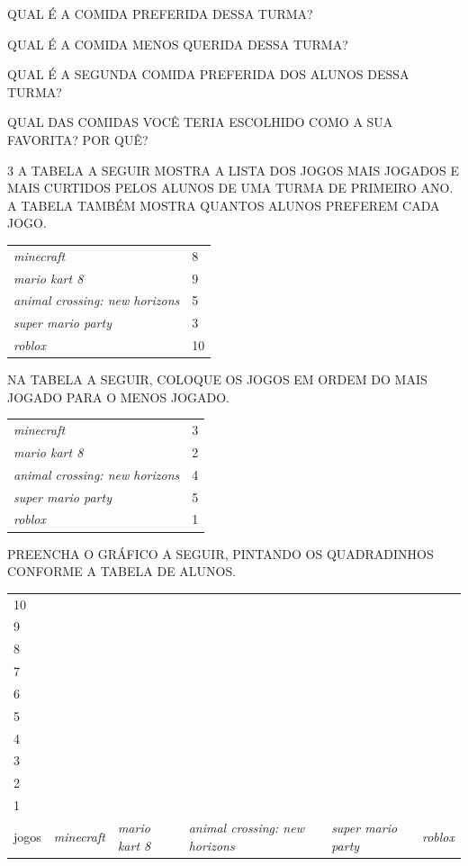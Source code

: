 \begin{escolha}
\item QUAL É A COMIDA PREFERIDA DESSA TURMA?


\item QUAL É A COMIDA MENOS QUERIDA DESSA TURMA?


\item QUAL É A SEGUNDA COMIDA PREFERIDA DOS ALUNOS DESSA TURMA?


\item QUAL DAS COMIDAS VOCÊ TERIA ESCOLHIDO COMO A SUA FAVORITA? POR QUÊ?

\end{escolha}

\num{3} A TABELA A SEGUIR MOSTRA A LISTA DOS JOGOS MAIS JOGADOS E MAIS CURTIDOS PELOS
ALUNOS DE UMA TURMA DE PRIMEIRO ANO. A TABELA TAMBÉM MOSTRA QUANTOS ALUNOS PREFEREM CADA
JOGO.

\begin{longtable}[]{@{}ll@{}}
\toprule
\emph{minecraft} & 8\tabularnewline
\emph{mario kart 8} & 9\tabularnewline
\emph{animal crossing: new horizons} & 5\tabularnewline
\emph{super mario party} & 3\tabularnewline
\emph{roblox} & 10\tabularnewline
\bottomrule
\end{longtable}

\begin{escolha}
\item NA TABELA A SEGUIR, COLOQUE OS JOGOS EM ORDEM DO MAIS JOGADO PARA O MENOS JOGADO.

\begin{longtable}[]{@{}ll@{}}
\toprule
\emph{minecraft} & 3\tabularnewline
\emph{mario kart 8} & 2\tabularnewline
\emph{animal crossing: new horizons} & 4\tabularnewline
\emph{super mario party} & 5\tabularnewline
\emph{roblox} & 1\tabularnewline
\bottomrule
\end{longtable}

\item PREENCHA O GRÁFICO A SEGUIR, PINTANDO OS QUADRADINHOS CONFORME A TABELA DE ALUNOS.

\begin{longtable}[]{@{}llllll@{}}
\toprule
10 & & & & &\tabularnewline
9 & & & & &\tabularnewline
8 & & & & &\tabularnewline
7 & & & & &\tabularnewline
6 & & & & &\tabularnewline
5 & & & & &\tabularnewline
4 & & & & &\tabularnewline
3 & & & & &\tabularnewline
2 & & & & &\tabularnewline
1 & & & & &\tabularnewline
jogos & \emph{minecraft} & \emph{mario kart 8} & \emph{animal crossing:
new horizons} & \emph{super mario party} & \emph{roblox}\tabularnewline
\bottomrule
\end{longtable}

\end{escolha}

